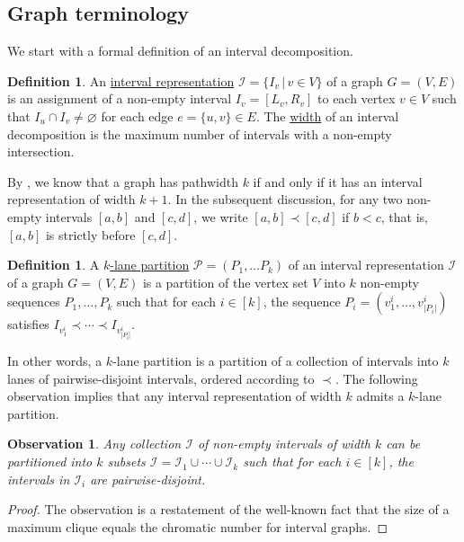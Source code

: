 \documentclass[11pt]{article}
\newtheorem{observation}[lemma]{Observation}
\theoremstyle{definition}
\newtheorem{definition}[lemma]{Definition}
\theoremstyle{remark}
\renewcommand{\emptyset}{\varnothing}
\begin{document}
\subsection{Graph terminology}\label{sect:interval}


We start with a formal definition of an interval decomposition. 

\begin{definition}
An \ul{interval representation} $\mathcal{I} = \{I_v \, | \, v \in V\}$ of a graph $G=(V,E)$ is an assignment of a non-empty interval $I_v = [L_v, R_v]$ to each vertex $v \in V$ such that $I_u \cap I_v \neq \emptyset$ for each edge $e = \{u,v\}\in E$. The \ul{width} of an interval decomposition is the maximum number of intervals with a non-empty intersection.
\end{definition}


By , we know that a graph has pathwidth $k$ if and only if it has an interval representation of width $k+1$.
In the subsequent discussion, for any two non-empty intervals $[a,b]$ and $[c,d]$, we write $[a,b] \prec [c,d]$ if $b < c$, that is, $[a,b]$ is strictly before $[c,d]$.

\begin{definition}
A \ul{$k$-lane partition}  $\mathcal{P}=(P_1, \ldots P_k)$  of an interval representation $\mathcal{I}$ of a graph $G=(V,E)$ is a partition of the vertex set $V$ into $k$ non-empty sequences $P_1, \ldots, P_k$ such that for each $i \in [k]$, the sequence $P_i=\left(v_1^{i}, \ldots, v_{|P_i|}^i\right)$ satisfies $I_{v_1^{i}} \prec \cdots \prec I_{v_{|P_i|}^{i}}$.
\end{definition}

In other words, a $k$-lane partition is a partition of a collection of intervals into $k$ lanes of pairwise-disjoint intervals, ordered according to $\prec$. The following observation implies that any interval representation of width $k$ admits a $k$-lane partition.

\begin{observation}
    \label{greedy-interval-split}
Any collection $\mathcal{I}$ of non-empty intervals of width $k$ can be partitioned into $k$ subsets $\mathcal{I}=\mathcal{I}_1 \cup \cdots \cup \mathcal{I}_k$ such that for each $i \in [k]$, the intervals in $\mathcal{I}_i$ are pairwise-disjoint.
\end{observation} 
\begin{proof}
The observation is a restatement of the well-known fact that the size of a maximum clique equals the chromatic number for interval graphs. 
\end{proof}
\end{document}
